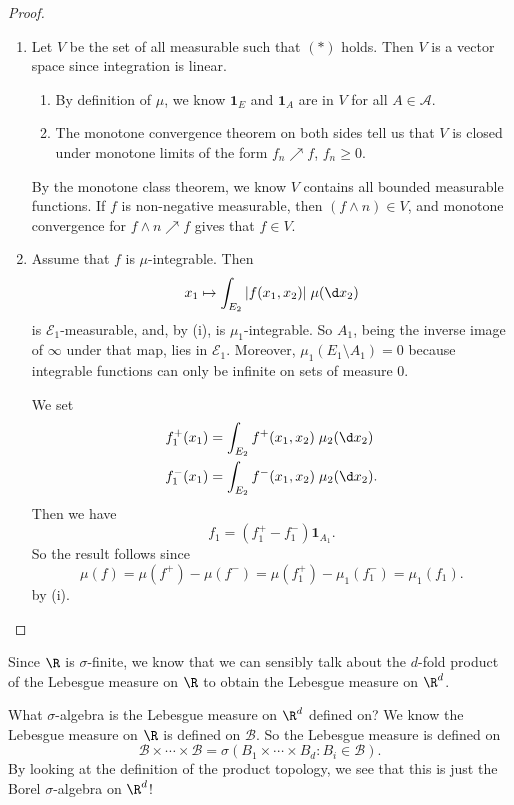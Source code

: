 \documentclass[a4paper]{article}
\begin{document}
\begin{proof}\leavevmode
  \begin{enumerate}
    \item Let $V$ be the set of all measurable such that $(*)$ holds. Then $V$ is a vector space since integration is linear.
      \begin{enumerate}
        \item By definition of $\mu$, we know $\mathbf{1}_E$ and $\mathbf{1}_A$ are in $V$ for all $A \in \mathcal{A}$.
        \item The monotone convergence theorem on both sides tell us that $V$ is closed under monotone limits of the form $f_n \nearrow f$, $f_n \geq 0$.
      \end{enumerate}
      By the monotone class theorem, we know $V$ contains all bounded measurable functions. If $f$ is non-negative measurable, then $(f \wedge n) \in V$, and monotone convergence for $f \wedge n \nearrow f$ gives that $f \in V$.
    \item Assume that $f$ is $\mu$-integrable. Then
      \[
        x_1 \mapsto \int_{E_2} |f(x_1, x_2)|\;\mu(\d x_2)
      \]
      is $\mathcal{E}_1$-measurable, and, by (i), is $\mu_1$-integrable. So $A_1$, being the inverse image of $\infty$ under that map, lies in $\mathcal{E}_1$. Moreover, $\mu_1(E_1 \setminus A_1) = 0$ because integrable functions can only be infinite on sets of measure $0$.

      We set
      \begin{align*}
        f_1^+(x_1) &= \int_{E_2} f^+(x_1, x_2)\;\mu_2(\d x_2)\\
        f_1^-(x_1) &= \int_{E_2} f^-(x_1, x_2)\;\mu_2(\d x_2).
      \end{align*}
      Then we have
      \[
        f_1 = (f_1^+ - f_1^-) \mathbf{1}_{A_1}.
      \]
      So the result follows since
      \[
        \mu(f) = \mu(f^+) - \mu(f^-) = \mu(f_1^+) - \mu_1(f_1^-) = \mu_1(f_1).
      \]
      by (i).
  \end{enumerate}
\end{proof}

Since $\R$ is $\sigma$-finite, we know that we can sensibly talk about the $d$-fold product of the Lebesgue measure on $\R$ to obtain the Lebesgue measure on $\R^d$.

What $\sigma$-algebra is the Lebesgue measure on $\R^d$ defined on? We know the Lebesgue measure on $\R$ is defined on $\mathcal{B}$. So the Lebesgue measure is defined on
\[
  \mathcal{B} \times \cdots \times \mathcal{B} = \sigma(B_1 \times \cdots \times B_d: B_i \in \mathcal{B}).
\]
By looking at the definition of the product topology, we see that this is just the Borel $\sigma$-algebra on $\R^d$!
\end{document}
